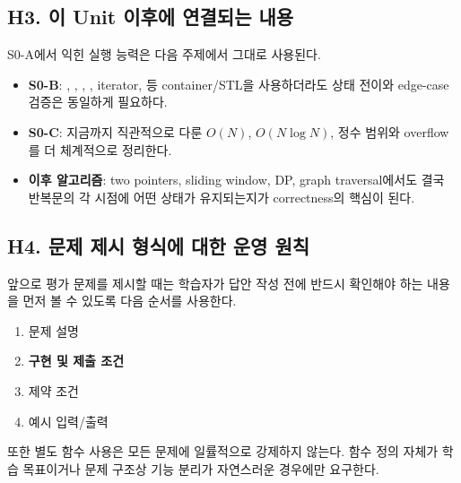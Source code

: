 \subsection{H3. 이 Unit 이후에 연결되는 내용}
S0-A에서 익힌 실행 능력은 다음 주제에서 그대로 사용된다.
\begin{itemize}
  \item \textbf{S0-B}: , , , , iterator,  등 container/STL을 사용하더라도 상태 전이와 edge-case 검증은 동일하게 필요하다.
  \item \textbf{S0-C}: 지금까지 직관적으로 다룬 $O(N)$, $O(N\log N)$, 정수 범위와 overflow를 더 체계적으로 정리한다.
  \item \textbf{이후 알고리즘}: two pointers, sliding window, DP, graph traversal에서도 결국 반복문의 각 시점에 어떤 상태가 유지되는지가 correctness의 핵심이 된다.
\end{itemize}

\subsection{H4. 문제 제시 형식에 대한 운영 원칙}
앞으로 평가 문제를 제시할 때는 학습자가 답안 작성 전에 반드시 확인해야 하는 내용을 먼저 볼 수 있도록 다음 순서를 사용한다.
\begin{enumerate}
  \item 문제 설명
  \item \textbf{구현 및 제출 조건}
  \item 제약 조건
  \item 예시 입력/출력
\end{enumerate}

또한 별도 함수 사용은 모든 문제에 일률적으로 강제하지 않는다. 함수 정의 자체가 학습 목표이거나 문제 구조상 기능 분리가 자연스러운 경우에만 요구한다.


